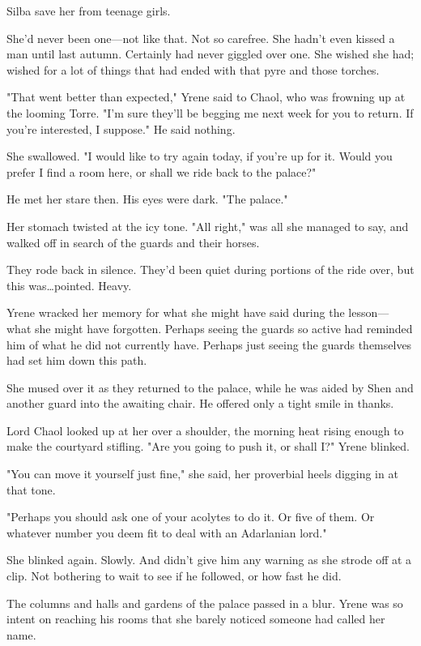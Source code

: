 Silba save her from teenage girls.

She'd never been one---not like that.
Not so carefree.
She hadn't even kissed a man until last autumn.
Certainly had never giggled over one.
She wished she had; wished for a lot of things that had ended with that pyre and those torches.

"That went better than expected," Yrene said to Chaol, who was frowning up at the looming Torre.
"I'm sure they'll be begging me next week for you to return.
If you're interested, I suppose."
He said nothing.

She swallowed.
"I would like to try again today, if you're up for it.
Would you prefer I find a room here, or shall we ride back to the palace?"

He met her stare then.
His eyes were dark.
"The palace."

Her stomach twisted at the icy tone.
"All right," was all she managed to say, and walked off in search of the guards and their horses.

They rode back in silence.
They'd been quiet during portions of the ride over, but this was\ldots pointed.
Heavy.

Yrene wracked her memory for what she might have said during the lesson--- what she might have forgotten.
Perhaps seeing the guards so active had reminded him of what he did not currently have.
Perhaps just seeing the guards themselves had set him down this path.

She mused over it as they returned to the palace, while he was aided by Shen and another guard into the awaiting chair.
He offered only a tight smile in thanks.

Lord Chaol looked up at her over a shoulder, the morning heat rising enough to make the courtyard stifling.
"Are you going to push it, or shall I?"
Yrene blinked.

"You can move it yourself just fine," she said, her proverbial heels digging in at that tone.

"Perhaps you should ask one of your acolytes to do it.
Or five of them.
Or whatever number you deem fit to deal with an Adarlanian lord."

She blinked again.
Slowly.
And didn't give him any warning as she strode off at a clip.
Not bothering to wait to see if he followed, or how fast he did.

The columns and halls and gardens of the palace passed in a blur.
Yrene was so intent on reaching his rooms that she barely noticed someone had called her name.

